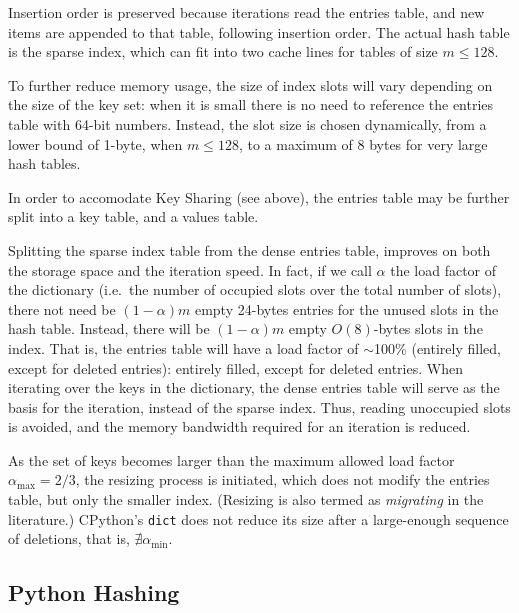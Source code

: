 Insertion order is preserved because iterations read the entries table, and new items are appended to that table, following insertion order.
The actual hash table is the sparse index, which can fit into two cache lines for tables of size $m \leq 128$.

To further reduce memory usage, the size of index slots will vary depending on the size of the key set: when it is small there is no need to reference the entries table with 64-bit numbers.
Instead, the slot size is chosen dynamically, from a lower bound of 1-byte, when $m \leq 128$, to a maximum of 8 bytes for very large hash tables.

In order to accomodate Key Sharing (see above), the entries table may be further split into a key table, and a values table.

Splitting the sparse index table from the dense entries table, improves on both the storage space and the iteration speed.
In fact, if we call $\alpha$ the load factor of the dictionary (i.e.\ the number of occupied slots over the total number of slots), there not need be $(1 - \alpha)m$ empty 24-bytes entries for the unused slots in the hash table.
Instead, there will be $(1 - \alpha)m$ empty $O(8)$-bytes slots in the index.
That is, the entries table will have a load factor of $\sim$100\% (entirely filled, except for deleted entries): entirely filled, except for deleted entries.
When iterating over the keys in the dictionary, the dense entries table will serve as the basis for the iteration, instead of the sparse index.
Thus, reading unoccupied slots is avoided, and the memory bandwidth required for an iteration is reduced.

As the set of keys becomes larger than the maximum allowed load factor $\alpha_{\max} = 2/3$, the resizing process is initiated, which does not modify the entries table, but only the smaller index.
(Resizing is also termed as \emph{migrating} in the literature.)
CPython's \texttt{dict} does not reduce its size after a large-enough sequence of deletions, that is, $\nexists\alpha_{\min}$.


\subsection{Python Hashing}\label{subsec:python-generated-hash-values}


